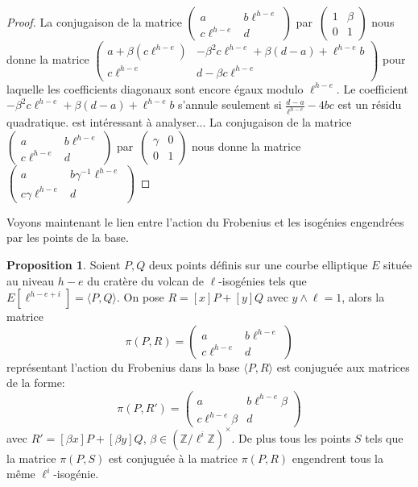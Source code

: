 \documentclass[10pt,a4paper]{book}
\theoremstyle{plain}
\theoremstyle{definition}
\theoremstyle{definition}
\theoremstyle{definition}
\newtheorem{prop}[thm]{Proposition}
\theoremstyle{definition}
\theoremstyle{remark}
\theoremstyle{remark}
\theoremstyle{definition}
\begin{document}
\begin{proof}
La conjugaison de la matrice $\left ( \begin{smallmatrix}a & b\ell^{h-e}\\c\ell^{h-e} & d
\end{smallmatrix}\right )$ par~$\left ( \begin{smallmatrix}1 & \beta \\0 & 1
\end{smallmatrix} \right )$   nous donne la matrice $\left ( \begin{smallmatrix}a + 
\beta (c\ell^{h-e}) & -\beta^2c\ell^{h-e} + \beta(d-a) +\ell^{h-e} b\\c\ell^{h-e} & d - \beta c\ell^{h-e}
\end{smallmatrix}\right )$ pour laquelle les coefficients diagonaux sont encore
égaux modulo $\ell^{h-e}$. Le coefficient $-\beta^2c\ell^{h-e} + \beta(d-a) +\ell^{h-e} b$ 
s'annule seulement si $\frac{d-a}{\ell^{h-e}}-4bc$ est un résidu quadratique.
est intéressant à analyser... 
La conjugaison de la matrice $\left ( \begin{smallmatrix}a & b\ell^{h-e}\\c\ell^{h-e} & d
\end{smallmatrix}\right )$ par~$\left ( \begin{smallmatrix} \gamma & 0 \\0 & 1
\end{smallmatrix} \right )$   nous donne la matrice $\left ( \begin{smallmatrix}a
 & b\gamma^{-1} \ell^{h-e} \\c \gamma \ell^{h-e} & d 
\end{smallmatrix}\right )$
\end{proof}

Voyons maintenant le lien entre l'action du Frobenius et les isogénies engendrées par les points de la base.

\begin{prop}
\label{pro:cla:fro:mat}
Soient $P,Q$ deux points définis sur une courbe elliptique $E$ située au niveau
$h-e$ du cratère du volcan de $\ell$-isogénies tels que 
$E[\ell^{h-e+i}]=\langle P,Q \rangle$. On pose $R=[x]P+[y]Q$ avec $y\wedge 
\ell=1$, alors la matrice 
\[
\pi(P,R)=\left ( \begin{matrix}a & b\ell^{h-e} \\ c\ell^{h-e} & d
\end{matrix}\right ) 
\] représentant l'action du Frobenius dans la base $\langle P,R \rangle$ est 
conjuguée aux matrices de la forme:
\[
\pi(P,R')=\left ( \begin{matrix}a & b\ell^{h-e}\beta \\ c\ell^{h-e}\beta & d
\end{matrix}\right ) 
\]
avec $R'=[\beta x]P+[\beta y]Q$, $\beta \in \left( \mathbb{Z}/\ell^{i} \mathbb{Z} 
\right)^{\times}$. De plus tous les points $S$ tels que la matrice $\pi(P,S)$ 
est conjuguée à la matrice $\pi(P,R)$ engendrent tous la même $\ell^i$-isogénie.
\end{prop}
\end{document}
